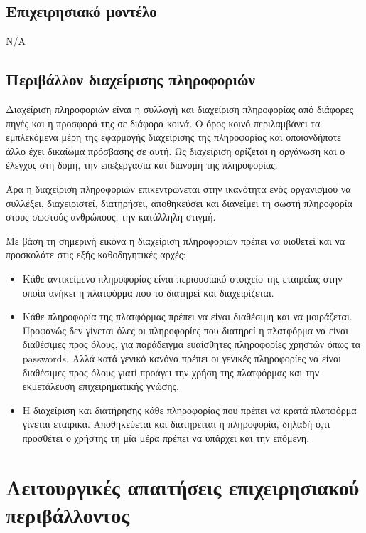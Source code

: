 \documentclass[12pt, oneside, a4paper]{report}
\begin{document}
\subsection{Επιχειρησιακό μοντέλο}
N/A

\subsection{Περιβάλλον διαχείρισης πληροφοριών}
\hspace{0.6cm}Διαχείριση πληροφοριών είναι η συλλογή και διαχείριση πληροφορίας από διάφορες πηγές και η προσφορά της σε διάφορα κοινά. Ο όρος κοινό περιλαμβάνει τα εμπλεκόμενα μέρη της εφαρμογής διαχείρισης της πληροφορίας και οποιονδήποτε άλλο έχει δικαίωμα πρόσβασης σε αυτή. Ως διαχείριση ορίζεται η οργάνωση και ο έλεγχος στη δομή, την επεξεργασία και διανομή της πληροφορίας.

\hspace{0.6cm}Άρα η διαχείριση πληροφοριών επικεντρώνεται στην ικανότητα ενός οργανισμού να συλλέξει, διαχειριστεί, διατηρήσει, αποθηκεύσει και διανείμει τη σωστή πληροφορία στους σωστούς ανθρώπους, την κατάλληλη στιγμή.

\hspace{0.6cm}Με βάση τη σημερινή εικόνα η διαχείριση πληροφοριών πρέπει να υιοθετεί και να προσκολάτε στις εξής καθοδηγητικές αρχές:
\begin{itemize}
 \item Κάθε αντικείμενο πληροφορίας είναι περιουσιακό στοιχείο της εταιρείας στην οποία ανήκει η πλατφόρμα που το διατηρεί και διαχειρίζεται.
 \item Κάθε πληροφορία της πλατφόρμας πρέπει να είναι διαθέσιμη και να μοιράζεται. Προφανώς δεν γίνεται όλες οι πληροφορίες που διατηρεί η πλατφόρμα να είναι διαθέσιμες προς όλους, για παράδειγμα ευαίσθητες πληροφορίες χρηστών όπως τα passwords. Αλλά κατά γενικό κανόνα πρέπει οι γενικές πληροφορίες να είναι διαθέσιμες προς όλους γιατί προάγει την χρήση της πλατφόρμας και την εκμετάλευση επιχειρηματικής γνώσης.
 \item Η διαχείριση και διατήρησης κάθε πληροφορίας που πρέπει να κρατά πλατφόρμα γίνεται εταιρικά. Αποθηκεύεται και διατηρείται η πληροφορία, δηλαδή ό,τι προσθέτει ο χρήστης τη μία μέρα πρέπει να υπάρχει και την επόμενη.
\end{itemize}



\section{Λειτουργικές απαιτήσεις επιχειρησιακού περιβάλλοντος}
\end{document}
